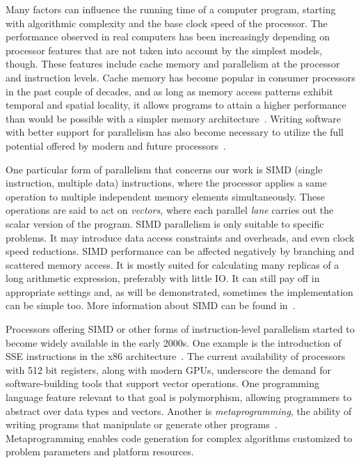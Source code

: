 \documentclass{juliacon}
\begin{document}
Many factors can influence the running time of a computer program, starting with algorithmic complexity and the base clock speed of the processor. The performance observed in real computers has been increasingly depending on processor features that are not taken into account by the simplest models, though. These features include cache memory and parallelism at the processor and instruction levels. Cache memory has become popular in consumer processors in the past couple of decades, and as long as memory access patterns exhibit temporal and spatial locality, it allows programs to attain a higher performance than would be possible with a simpler memory architecture~\cite[Chapter 3]{Drepper07whatevery}. Writing software with better support for parallelism has also become necessary to utilize the full potential offered by modern and future processors~\cite{wilson2018}.

One particular form of parallelism that concerns our work is SIMD (single instruction, multiple data) instructions, where the processor applies a same operation to multiple independent memory elements simultaneously. These operations are said to act on {\em vectors}, where each parallel {\em lane} carries out the scalar version of the program. SIMD parallelism is only suitable to specific problems. It may introduce data access constraints and overheads, and even clock speed reductions. SIMD performance can be affected negatively by branching and scattered memory access. It is mostly suited for calculating many replicas of a long arithmetic expression, preferably with little IO. It can still pay off in appropriate settings and, as will be demonstrated, sometimes the implementation can be simple too. More information about SIMD can be found in~\cite{SIMDtut}.

Processors offering SIMD or other forms of instruction-level parallelism started to become widely available in the early 2000s. One example is the introduction of SSE instructions in the x86 architecture~\cite[Chapter 1]{kusswurm18}. The current availability of processors with 512 bit registers, along with modern GPUs, underscore the demand for software-building tools that support vector operations. One programming language feature relevant to that goal is polymorphism, allowing programmers to abstract over data types and vectors. Another is {\em metaprogramming}, the ability of writing programs that manipulate or generate other programs~\cite{Abelson1996}\cite[Ch.25]{JuliaDocs}. Metaprogramming enables code generation for complex algorithms customized to problem parameters and platform resources.
\end{document}
